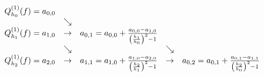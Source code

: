 \begin{align*}
\begin{array}{ccccc}
    Q_{h_0}^{(1)}(f) = a_{0,0}
    &&&& \\
    & \searrow &&& \\
    Q_{h_1}^{(1)}(f) = a_{1,0}
    & \rightarrow &
    a_{0,1}
    = a_{0,0} + \frac{a_{0,0} - a_{1,0}}{{\left ( \frac{h_1}{h_0} \right )}^2 - 1}
    && \\
    & \searrow && \searrow & \\
    Q_{h_2}^{(1)}(f) = a_{2,0}
    & \rightarrow &
    a_{1,1}
    = a_{1,0} + \frac{a_{1,0} - a_{2,0}}{{\left ( \frac{h_2}{h_1} \right )}^2 - 1}
    & \rightarrow &
    a_{0,2}
    = a_{0,1} + \frac{a_{0,1} - a_{1,1}}{{\left ( \frac{h_2}{h_0} \right )}^2 - 1} \\
\end{array}
\end{align*}